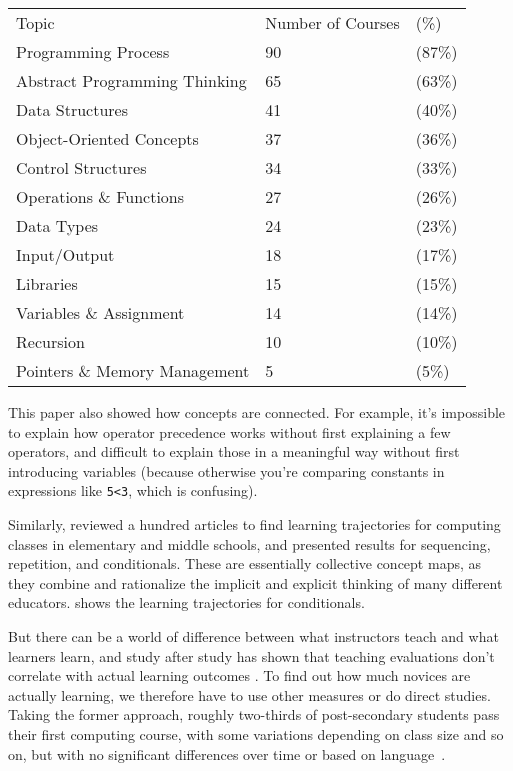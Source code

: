 \begin{longtable}[]{@{}lll@{}}
Topic & Number of Courses & (\%)\\
Programming Process & 90 & (87\%)\\
Abstract Programming Thinking & 65 & (63\%)\\
Data Structures & 41 & (40\%)\\
Object-Oriented Concepts & 37 & (36\%)\\
Control Structures & 34 & (33\%)\\
Operations \& Functions & 27 & (26\%)\\
Data Types & 24 & (23\%)\\
Input/Output & 18 & (17\%)\\
Libraries & 15 & (15\%)\\
Variables \& Assignment & 14 & (14\%)\\
Recursion & 10 & (10\%)\\
Pointers \& Memory Management & 5 & (5\%)\\
\end{longtable}

This paper also showed how concepts are connected. For example, it's
impossible to explain how operator precedence works without first
explaining a few operators, and difficult to explain those in a
meaningful way without first introducing variables (because otherwise
you're comparing constants in expressions like \texttt{5\textless{}3}, which is
confusing).

Similarly, \cite{Rich2017} reviewed a hundred articles to find
learning trajectories for computing classes in elementary and middle
schools, and presented results for sequencing, repetition, and
conditionals. These are essentially collective concept maps, as they
combine and rationalize the implicit and explicit thinking of many
different educators.  shows the learning
trajectories for conditionals.


But there can be a world of difference between what instructors teach
and what learners learn, and study after study has shown that teaching
evaluations don't correlate with actual learning outcomes
\cite{Star2014,Uttl2017}. To find out how much novices are actually
learning, we therefore have to use other measures or do direct studies.
Taking the former approach, roughly two-thirds of post-secondary
students pass their first computing course, with some variations
depending on class size and so on, but with no significant differences
over time or based on language~\cite{Benn2007a,Wats2014}.

